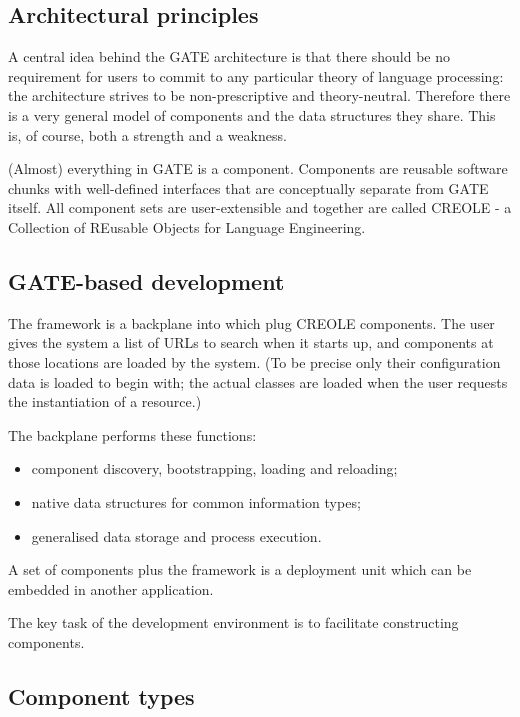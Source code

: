 \subsection{Architectural principles}


A central idea behind the GATE architecture is that there should be
no requirement for users to commit to any particular theory of
language processing: the architecture strives to be non-prescriptive and
theory-neutral. Therefore there is a very general model of components and the
data structures they share. This is, of course, both a strength and a
weakness.

(Almost) everything in GATE is a component. Components are
reusable software chunks with well-defined interfaces
that are conceptually separate from GATE itself.
All component sets are user-extensible and together are called CREOLE - a
Collection of REusable Objects for Language Engineering.

\subsection{GATE-based development}


The framework is a backplane into which plug CREOLE components.
The user gives the system a list of URLs to search when it starts up,
and components at those locations are loaded by the system. (To be precise
only their configuration data is loaded to begin with; the actual classes
are loaded when the user requests the instantiation of a resource.)

The backplane performs these functions:
\begin{itemize}
\item 
component discovery, bootstrapping, loading and reloading;
\item 
native data structures for common information types;
\item 
generalised data storage and process execution.
\end{itemize}

A set of components plus the framework is a deployment unit which can be
embedded in another application.

The key task of the 
development environment is to facilitate constructing components.

\subsection{Component types}


